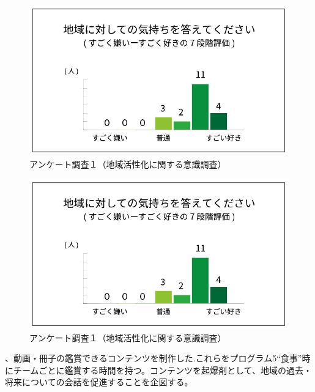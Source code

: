 \documentclass[a4paper]{jsarticle}
\begin{document}
\begin{figure}[h]
  \begin{center}
    \includegraphics[width=0.95\hsize]{./images/03}
    \caption{アンケート調査１（地域活性化に関する意識調査）}
    \label{fig:tmu_hino}
  \end{center}
\end{figure}
\begin{figure}[h]
  \begin{center}
    \includegraphics[width=0.95\hsize]{./images/03}
    \caption{アンケート調査１（地域活性化に関する意識調査）}
    \label{fig:tmu_hino}
  \end{center}
\end{figure}


、動画・冊子の鑑賞できるコンテンツを制作した.これらをプログラム5“食事”時にチームごとに鑑賞する時間を持つ。コンテンツを起爆剤として、地域の過去・将来についての会話を促進することを企図する。\\\\
\end{document}
